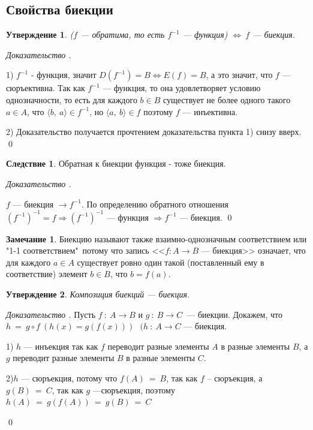 \documentclass[12pt,oneside]{article}
\newtheorem{statement}{Утверждение}[section]
\theoremstyle{definition}
\newtheorem{remark}{Замечание}[section]
\newtheorem{corollary}{Следствие}[section]
\newenvironment{ourproof}[1]{\textit{Доказательство #1.}}{\qed}
\begin{document}
\subsection{Свойства биекции}

\begin{statement}\label{biek_obr}
($f$ --- обратима, то есть $f^{-1}$ --- функция) $\Longleftrightarrow \ f$ --- биекция.
\end{statement}
\begin{ourproof}{}

1) $f^{-1}$ - функция, значит $D(f^{-1}) = B \Longleftrightarrow E(f)=B$, а это значит, что $f$ --- сюръективна. Так как $f^{-1}$ --- функция, то она удовлетворяет условию однозначности, то есть для каждого $b\in B$ существует не более одного такого $a\in A$, что $\langle b,\ a\rangle \in f^{-1}$, но $\langle a,\ b\rangle \in f$ поэтому $f$ --- инъективна.

2) Доказательство получается прочтением доказательства пункта 1) снизу вверх.
\end{ourproof}

\begin{corollary}\label{corollary_biek_biek}
Обратная к биекции функция - тоже биекция.

\begin{ourproof}{}

$f$ --- биекция $\longrightarrow f^{-1}$. По определению обратного отношения $(f^{-1})^{-1} = f \Longrightarrow (f^{-1})^{-1}$ --- функция $\Longrightarrow f^{-1}$ --- биекция.
\end{ourproof}
\end{corollary}

\begin{remark}
Биекцию называют также взаимно-однозначным соответствием или "1-1 соответствием"\, потому что запись <<$f\colon A \longrightarrow B$ --- биекция>> означает, что для каждого $a\in A$ существует ровно один такой (поставленный ему в соответствие) элемент $b\in B$, что $b=f(a)$.
\end{remark} 

\begin{statement}\label{biek_comp}
Композиция биекций --- биекция.
\end{statement}
\begin{ourproof}{}
Пусть $f\ :\ A \longrightarrow B$ и $g\ :\ B \longrightarrow C$\ --- биекции. Докажем, что $h\ =\ g \circ f\ (h(x) = g(f(x)))\ \ \ (h\ :\ A \longrightarrow C$ --- биекция.

1) $h$ --- инъекция так как $f$ переводит разные элементы $A$ в разные элементы $B$, а $g$ переводит разные элементы $B$ в разные элементы $C$.

2)$h$ --- сюръекция, потому что $f(A)\ =\ B$, так как $f$ -- сюръекция, а $g(B)\ =\ C$, так как $g$ ---сюръекция, поэтому $h(A)\ =\ g(f(A))\ =\ g(B)\ =\ C$

\end{ourproof}
\end{document}
